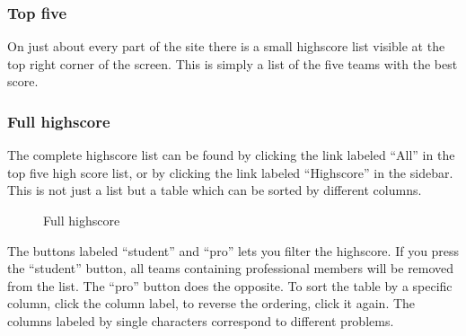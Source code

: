 \subsubsection{Top five}

On just about every part of the site there is a small highscore list
visible at the top right corner of the screen. This is simply a list of
the five teams with the best score. 

\subsubsection{Full highscore}

The complete highscore list can be found by clicking the link labeled
{\textquotedblleft}All{\textquotedblright} in the top five high score
list, or by clicking the link labeled
{\textquotedblleft}Highscore{\textquotedblright} in the sidebar. This
is not just a list but a table which can be sorted by different
columns.
\begin{figure}
\centering
	\caption{Full highscore}
	\label{fig:fullHighscore}
\end{figure}

The buttons labeled {\textquotedblleft}student{\textquotedblright} and
{\textquotedblleft}pro{\textquotedblright} lets you filter the
highscore. If you press the
{\textquotedblleft}student{\textquotedblright} button, all teams
containing professional members will be removed from the list. The
{\textquotedblleft}pro{\textquotedblright} button does the opposite. To
sort the table by a specific column, click the column label, to reverse
the ordering, click it again. The columns labeled by single characters
correspond to different problems. 

